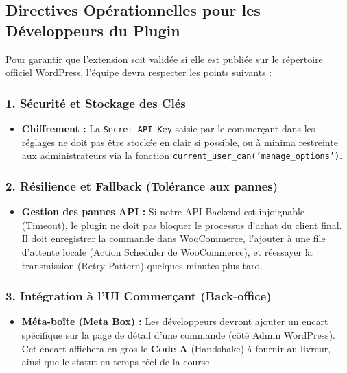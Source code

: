 \subsection{Directives Opérationnelles pour les Développeurs du Plugin}

Pour garantir que l'extension soit validée si elle est publiée sur le répertoire officiel WordPress, l'équipe devra respecter les points suivants :

\subsubsection{1. Sécurité et Stockage des Clés}
\begin{itemize}
    \item \textbf{Chiffrement :} La \texttt{Secret API Key} saisie par le commerçant dans les réglages ne doit pas être stockée en clair si possible, ou à minima restreinte aux administrateurs via la fonction \texttt{current\_user\_can('manage\_options')}.
\end{itemize}

\subsubsection{2. Résilience et Fallback (Tolérance aux pannes)}
\begin{itemize}
    \item \textbf{Gestion des pannes API :} Si notre API Backend est injoignable (Timeout), le plugin \underline{ne doit pas} bloquer le processus d'achat du client final. Il doit enregistrer la commande dans WooCommerce, l'ajouter à une file d'attente locale (Action Scheduler de WooCommerce), et réessayer la transmission (Retry Pattern) quelques minutes plus tard.
\end{itemize}

\subsubsection{3. Intégration à l'UI Commerçant (Back-office)}
\begin{itemize}
    \item \textbf{Méta-boîte (Meta Box) :} Les développeurs devront ajouter un encart spécifique sur la page de détail d'une commande (côté Admin WordPress). Cet encart affichera en gros le \textbf{Code A} (Handshake) à fournir au livreur, ainsi que le statut en temps réel de la course.
\end{itemize}